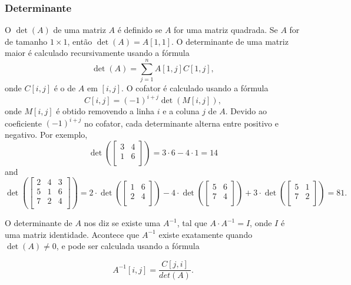 \subsubsection{Determinante}


O  $\det(A)$ de uma matriz $A$
é definido se $A$ for uma matriz quadrada.
Se $A$ for de tamanho $1 \times 1$,
então $\det(A)=A[1,1]$.
O determinante de uma matriz maior é
calculado recursivamente usando a fórmula 
\[\det(A)=\sum_{j=1}^n A[1,j] C[1,j],\]
onde $C[i,j]$ é o  de $A$
em $[i,j]$.
O cofator é calculado usando a fórmula
\[C[i,j] = (-1)^{i+j} \det(M[i,j]),\]
onde $M[i,j]$ é obtido removendo
a linha $i$ e a coluna $j$ de $A$.
Devido ao coeficiente $(-1)^{i+j}$ no cofator,
cada determinante alterna entre positivo
e negativo.
Por exemplo,
\[
\det(
 \begin{bmatrix}
  3 & 4 \\
  1 & 6 \\
 \end{bmatrix}
) = 3 \cdot 6 - 4 \cdot 1 = 14 
\]
and
\[
\det(
 \begin{bmatrix}
  2 & 4 & 3 \\
  5 & 1 & 6 \\
  7 & 2 & 4 \\
 \end{bmatrix}
) = 
2 \cdot
\det(
 \begin{bmatrix}
  1 & 6 \\
  2 & 4 \\
 \end{bmatrix}
)
-4 \cdot
\det(
 \begin{bmatrix}
  5 & 6 \\
  7 & 4 \\
 \end{bmatrix}
)
+3 \cdot
\det(
 \begin{bmatrix}
  5 & 1 \\
  7 & 2 \\
 \end{bmatrix}
) = 81.
\]


O determinante de $A$ nos diz
se existe uma 
$A^{-1}$, tal que $A \cdot A^{-1} = I$,
onde $I$ é uma matriz identidade.
Acontece que $A^{-1}$ existe
exatamente quando $\det(A) \neq 0$,
e pode ser calculada usando a fórmula

\[A^{-1}[i,j] = \frac{C[j,i]}{det(A)}.\]

